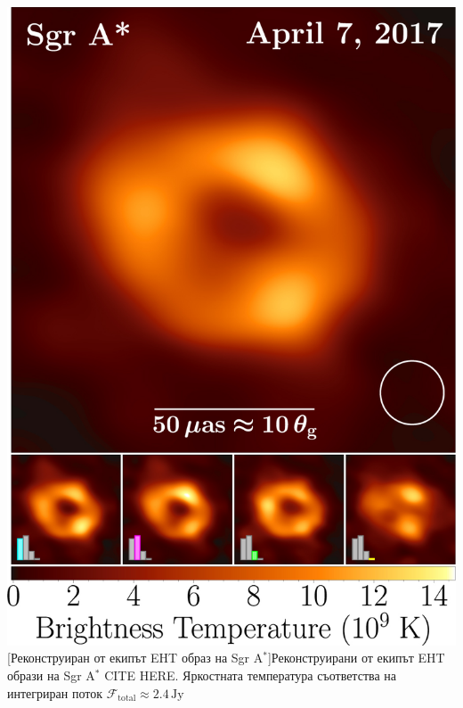 \noindent\begin{minipage}{14em}
	\centering
	\includegraphics[scale = 0.6]{SgrA_Avg_Images.jpg}
	[Реконструиран от екипът EHT образ на Sgr A$^*$]{\small Реконструирани от екипът EHT образи на Sgr A$^*$ CITE HERE. Яркостната температура съответства на интегриран поток $\mathcal{F}_{\text{total}}\approx2.4\,\text{Jy}$}
	\label{SgrA_I_Image}
\end{minipage}\,\,
